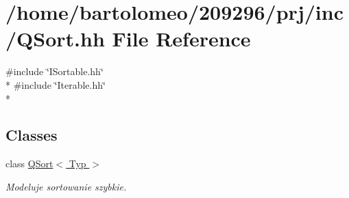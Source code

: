 \hypertarget{_q_sort_8hh}{\section{/home/bartolomeo/209296/prj/inc/\-Q\-Sort.hh File Reference}
\label{_q_sort_8hh}
}
{\ttfamily \#include \char`\"{}I\-Sortable.\-hh\char`\"{}}\\*
{\ttfamily \#include \char`\"{}Iterable.\-hh\char`\"{}}\\*
\subsection*{Classes}
\begin{DoxyCompactItemize}
\item 
class \hyperlink{class_q_sort}{Q\-Sort$<$ Typ $>$}
\begin{DoxyCompactList}\small\item\em Modeluje sortowanie szybkie. \end{DoxyCompactList}\end{DoxyCompactItemize}
